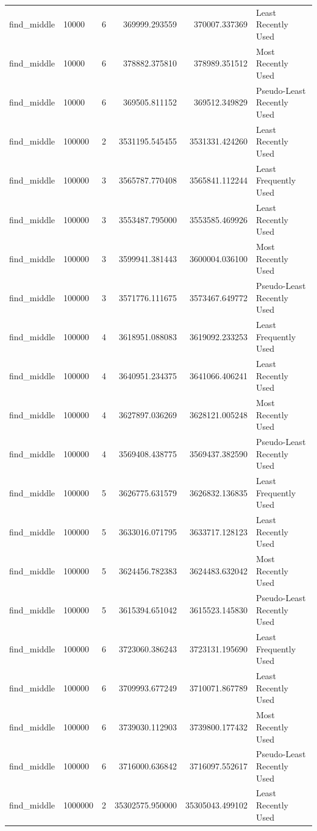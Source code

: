 \begin{tabular}{llrrrl}
find_middle & 10000 & 6 & 369999.293559 & 370007.337369 & Least Recently Used \\
find_middle & 10000 & 6 & 378882.375810 & 378989.351512 & Most Recently Used \\
find_middle & 10000 & 6 & 369505.811152 & 369512.349829 & Pseudo-Least Recently Used \\
find_middle & 100000 & 2 & 3531195.545455 & 3531331.424260 & Least Recently Used \\
find_middle & 100000 & 3 & 3565787.770408 & 3565841.112244 & Least Frequently Used \\
find_middle & 100000 & 3 & 3553487.795000 & 3553585.469926 & Least Recently Used \\
find_middle & 100000 & 3 & 3599941.381443 & 3600004.036100 & Most Recently Used \\
find_middle & 100000 & 3 & 3571776.111675 & 3573467.649772 & Pseudo-Least Recently Used \\
find_middle & 100000 & 4 & 3618951.088083 & 3619092.233253 & Least Frequently Used \\
find_middle & 100000 & 4 & 3640951.234375 & 3641066.406241 & Least Recently Used \\
find_middle & 100000 & 4 & 3627897.036269 & 3628121.005248 & Most Recently Used \\
find_middle & 100000 & 4 & 3569408.438775 & 3569437.382590 & Pseudo-Least Recently Used \\
find_middle & 100000 & 5 & 3626775.631579 & 3626832.136835 & Least Frequently Used \\
find_middle & 100000 & 5 & 3633016.071795 & 3633717.128123 & Least Recently Used \\
find_middle & 100000 & 5 & 3624456.782383 & 3624483.632042 & Most Recently Used \\
find_middle & 100000 & 5 & 3615394.651042 & 3615523.145830 & Pseudo-Least Recently Used \\
find_middle & 100000 & 6 & 3723060.386243 & 3723131.195690 & Least Frequently Used \\
find_middle & 100000 & 6 & 3709993.677249 & 3710071.867789 & Least Recently Used \\
find_middle & 100000 & 6 & 3739030.112903 & 3739800.177432 & Most Recently Used \\
find_middle & 100000 & 6 & 3716000.636842 & 3716097.552617 & Pseudo-Least Recently Used \\
find_middle & 1000000 & 2 & 35302575.950000 & 35305043.499102 & Least Recently Used \\

\end{tabular}
